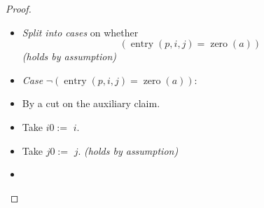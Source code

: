 \documentclass[11pt]{article}
\theoremstyle{plain}
\begin{document}
\begin{proof}
\begin{itemize}[leftmargin=2.8em, itemsep=4pt, parsep=1pt]
  \item[\textbf{101--118}] \emph{Split into cases} on whether
\begin{equation*}
(\operatorname{entry}(p, i, j) = \operatorname{zero}(a))
\end{equation*}
  \emph{(holds by assumption)}
  \item[]\emph{Case} $\lnot (\operatorname{entry}(p, i, j) = \operatorname{zero}(a))$:
  \item[\textbf{119}] By a cut on the auxiliary claim.
  \item[\textbf{120}] Take $\mathit{i0} :=$ $i$.
  \item[\textbf{121--126}] Take $\mathit{j0} :=$ $j$.  \emph{(holds by assumption)}
  \item[\textbf{127}] 
\end{itemize}
\end{proof}
\end{document}
